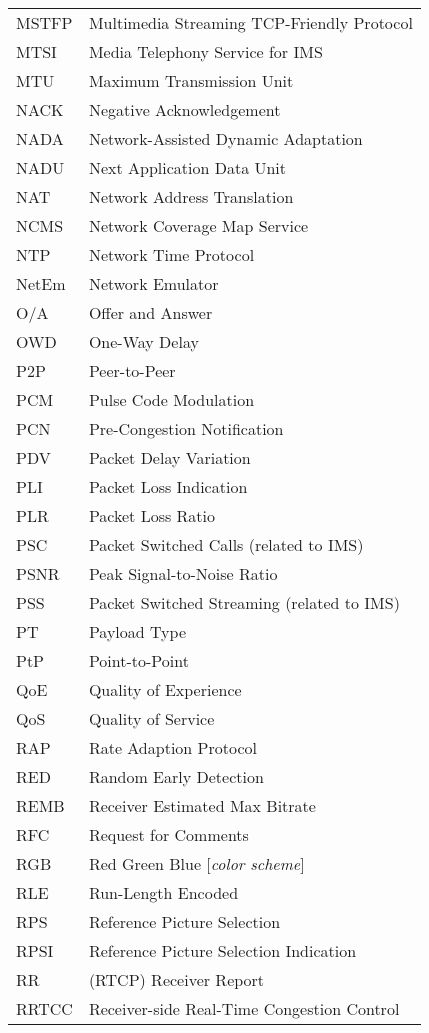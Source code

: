 \begin{longtable}{ll}
MSTFP 	& Multimedia Streaming TCP-Friendly Protocol \\
MTSI 	& Media Telephony Service for IMS\\
MTU  	& Maximum Transmission Unit \\
NACK 	& Negative Acknowledgement \\
NADA 	& Network-Assisted Dynamic Adaptation \\
NADU 	& Next Application Data Unit \\
NAT 	& Network Address Translation \\
NCMS 	& Network Coverage Map Service\\
NTP  	& Network Time Protocol \\
NetEm 	& Network Emulator \\
O/A  	& Offer and Answer \\
OWD 	& One-Way Delay \\
P2P 	& Peer-to-Peer \\
PCM 	& Pulse Code Modulation \\
PCN 	& Pre-Congestion Notification \\
PDV 	& Packet Delay Variation \\
PLI 	& Packet Loss Indication \\
PLR 	& Packet Loss Ratio \\
PSC 	& Packet Switched Calls (related to IMS)\\
PSNR	& Peak Signal-to-Noise Ratio \\
PSS 	& Packet Switched Streaming (related to IMS)\\
PT  	& Payload Type \\
PtP 	& Point-to-Point \\
QoE 	& Quality of Experience \\
QoS 	& Quality of Service \\
RAP 	& Rate Adaption Protocol \\
RED 	& Random Early Detection \\
REMB 	& Receiver Estimated Max Bitrate \\
RFC 	& Request for Comments \\
RGB 	& Red Green Blue [\textit{color scheme}] \\
RLE 	& Run-Length Encoded \\
RPS 	& Reference Picture Selection \\
RPSI 	& Reference Picture Selection Indication \\
RR  	& (RTCP) Receiver Report \\
RRTCC	& Receiver-side Real-Time Congestion Control \\

\end{longtable}
